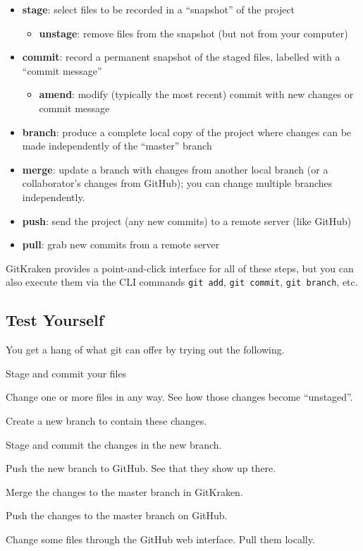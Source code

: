 \documentclass[12pt, a4paper]{article}
\begin{document}
\begin{itemize}
\item \textbf{stage}: select files to be recorded in a ``snapshot'' of the project
	\begin{itemize}
	\item \textbf{unstage}: remove files from the snapshot (but not from your computer)
	\end{itemize}
\item \textbf{commit}: record a permanent snapshot of the staged files, labelled with a ``commit message''
	\begin{itemize}
	\item \textbf{amend}: modify (typically the most recent) commit with new changes or commit message
	\end{itemize}
\item \textbf{branch}: produce a complete local copy of the project where changes can be made independently of the ``master'' branch
\item \textbf{merge}: update a branch with changes from another local branch (or a collaborator's changes from GitHub); you can change multiple branches independently.
\item \textbf{push}: send the project (any new commits) to a remote server (like GitHub)
\item \textbf{pull}: grab new commits from a remote server
\end{itemize}

GitKraken provides a point-and-click interface for all of these steps, but you can also execute them via the CLI commands \texttt{git add}, \texttt{git commit}, \texttt{git branch}, etc.

\subsection*{Test Yourself}

You get a hang of what git can offer by trying out the following.

\begin{enumerate*}
\item Stage and commit your files
\item Change one or more files in any way. See how those changes become ``unstaged''.
\item Create a new branch to contain these changes.
\item Stage and commit the changes in the new branch.
\item Push the new branch to GitHub. See that they show up there.
\item Merge the changes to the master branch in GitKraken.
\item Push the changes to the master branch on GitHub.
\item Change some files through the GitHub web interface. Pull them locally.
\end{enumerate*}
\end{document}
